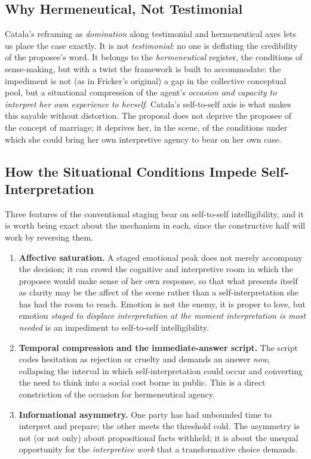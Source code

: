 \documentclass[11pt,a4paper]{article}
\begin{document}
\subsection{Why Hermeneutical, Not Testimonial}

Catala's reframing as \emph{domination} along testimonial and hermeneutical axes lets us place the case exactly. It is not \emph{testimonial}: no one is deflating the credibility of the proposee's word. It belongs to the \emph{hermeneutical} register, the conditions of sense-making, but with a twist the framework is built to accommodate: the impediment is not (as in Fricker's original) a gap in the collective conceptual pool, but a situational compression of the agent's \emph{occasion and capacity to interpret her own experience to herself}. Catala's self-to-self axis is what makes this sayable without distortion. The proposal does not deprive the proposee of the concept of marriage; it deprives her, in the scene, of the conditions under which she could bring her own interpretive agency to bear on her own case.

\subsection{How the Situational Conditions Impede Self-Interpretation}

Three features of the conventional staging bear on self-to-self intelligibility, and it is worth being exact about the mechanism in each, since the constructive half will work by reversing them.

\begin{enumerate}
\item \textbf{Affective saturation.} A staged emotional peak does not merely accompany the decision; it can crowd the cognitive and interpretive room in which the proposee would make sense of her own response, so that what presents itself as clarity may be the affect of the scene rather than a self-interpretation she has had the room to reach. Emotion is not the enemy, it is proper to love, but emotion \emph{staged to displace interpretation at the moment interpretation is most needed} is an impediment to self-to-self intelligibility.
\item \textbf{Temporal compression and the immediate-answer script.} The script codes hesitation as rejection or cruelty and demands an answer \emph{now}, collapsing the interval in which self-interpretation could occur and converting the need to think into a social cost borne in public. This is a direct constriction of the occasion for hermeneutical agency.
\item \textbf{Informational asymmetry.} One party has had unbounded time to interpret and prepare; the other meets the threshold cold. The asymmetry is not (or not only) about propositional facts withheld; it is about the unequal opportunity for the \emph{interpretive work} that a transformative choice demands.
\end{enumerate}
\end{document}
